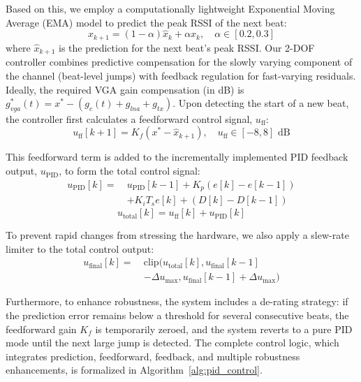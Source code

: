 \documentclass[journal]{IEEEtran}
\begin{document}
Based on this, we employ a computationally lightweight Exponential Moving Average (EMA) model to predict the peak RSSI of the next beat:
\begin{equation}
\hat{x}_{k+1} = (1-\alpha)\hat{x}_k + \alpha x_k, \quad \alpha \in [0.2, 0.3]
\end{equation}
where $\hat{x}_{k+1}$ is the prediction for the next beat's peak RSSI. Our 2-DOF controller combines predictive compensation for the slowly varying component of the channel (beat-level jumps) with feedback regulation for fast-varying residuals. Ideally, the required VGA gain compensation (in dB) is $g_{vga}^*(t) = x^* - (g_c(t) + g_{lna} + g_{tx})$. Upon detecting the start of a new beat, the controller first calculates a feedforward control signal, $u_{\mathrm{ff}}$:
\begin{equation}
    u_{\mathrm{ff}}[k+1] = K_f (x^* - \hat{x}_{k+1}), \quad u_{\mathrm{ff}} \in [-8, 8] \text{ dB}
\end{equation}

This feedforward term is added to the incrementally implemented PID feedback output, $u_{\mathrm{PID}}$, to form the total control signal:
\begin{equation}
\begin{aligned}
    u_{\mathrm{PID}}[k] =\ & u_{\mathrm{PID}}[k-1] + K_p(e[k]-e[k-1]) \\
    & + K_i T_s e[k] + (D[k]-D[k-1])
\end{aligned}
\end{equation}
\begin{equation}
u_{\mathrm{total}}[k] = u_{\mathrm{ff}}[k] + u_{\mathrm{PID}}[k]
\end{equation}

To prevent rapid changes from stressing the hardware, we also apply a slew-rate limiter to the total control output:
\begin{equation}
    \begin{aligned}
    u_{\text{final}}[k] =\ & \text{clip}(u_{\text{total}}[k], u_{\text{final}}[k-1]\\
    &  - \Delta u_{\text{max}}, u_{\text{final}}[k-1] + \Delta u_{\text{max}})
     \end{aligned}
\end{equation}

Furthermore, to enhance robustness, the system includes a de-rating strategy: if the prediction error remains below a threshold for several consecutive beats, the feedforward gain $K_f$ is temporarily zeroed, and the system reverts to a pure PID mode until the next large jump is detected. The complete control logic, which integrates prediction, feedforward, feedback, and multiple robustness enhancements, is formalized in Algorithm~\ref{alg:pid_control}.
\end{document}
